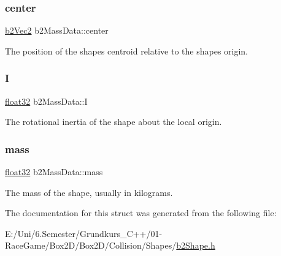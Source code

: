 \subsubsection{\texorpdfstring{center}{center}}
{\footnotesize\ttfamily \mbox{\hyperlink{structb2_vec2}{b2\+Vec2}} b2\+Mass\+Data\+::center}



The position of the shape\textquotesingle{}s centroid relative to the shape\textquotesingle{}s origin. 

\mbox{\label{structb2_mass_data_ad2d06e96e2d79d895df16ae0e5fe0376}} 
\subsubsection{\texorpdfstring{I}{I}}
{\footnotesize\ttfamily \mbox{\hyperlink{b2_settings_8h_aacdc525d6f7bddb3ae95d5c311bd06a1}{float32}} b2\+Mass\+Data\+::I}



The rotational inertia of the shape about the local origin. 

\mbox{\label{structb2_mass_data_aea85d9595a38d2eed05b8d2ea80d97b1}} 
\subsubsection{\texorpdfstring{mass}{mass}}
{\footnotesize\ttfamily \mbox{\hyperlink{b2_settings_8h_aacdc525d6f7bddb3ae95d5c311bd06a1}{float32}} b2\+Mass\+Data\+::mass}



The mass of the shape, usually in kilograms. 



The documentation for this struct was generated from the following file\+:\begin{DoxyCompactItemize}
\item 
E\+:/\+Uni/6.\+Semester/\+Grundkurs\+\_\+\+C++/01-\/\+Race\+Game/\+Box2\+D/\+Box2\+D/\+Collision/\+Shapes/\mbox{\hyperlink{b2_shape_8h}{b2\+Shape.\+h}}\end{DoxyCompactItemize}
